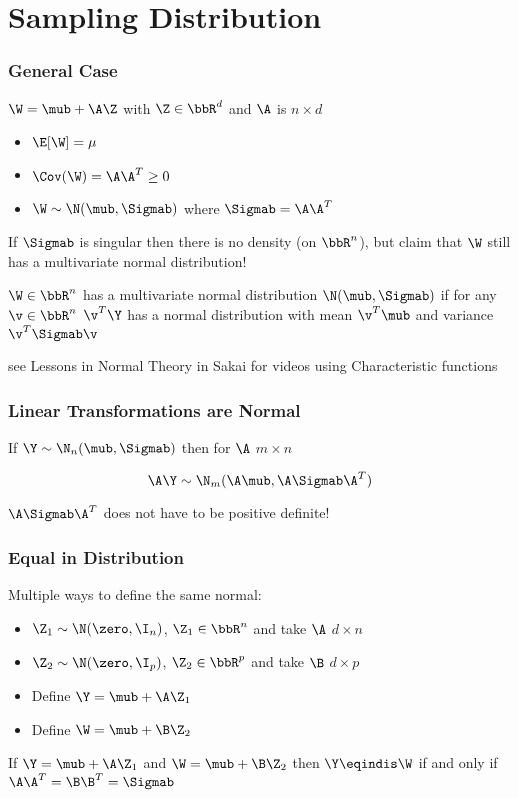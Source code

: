 \documentclass{beamer}
\begin{document}
\section{Sampling Distribution}

\begin{frame} \frametitle{General Case}
$\W = \mub + \A \Z$  with $\Z \in \bbR^d$ and $\A$ is $n \times d$ \pause
\begin{itemize}
\item $\E[\W] = \mu$ \pause
\item $\Cov(\W) = \A \A^T \ge 0$ \pause
\item $\W \sim \N(\mub, \Sigmab)$ where $\Sigmab = \A \A^T$
\end{itemize}
  If $\Sigmab$ is singular then there is no density (on $\bbR^n$), but claim that
  $\W$ still has a multivariate normal distribution!  \pause

 \begin{definition}
  $\W \in \bbR^n$ has a  multivariate normal distribution $\N(\mub,
  \Sigmab)$ if for any $\v \in \bbR^n$ $\v^T\Y$ has a normal
  distribution with mean $\v^T\mub$ and variance $\v^T\Sigmab \v$
  \end{definition} \pause

see Lessons in Normal Theory in Sakai for videos using Characteristic functions
\end{frame}

\begin{frame} \frametitle{Linear Transformations are Normal}

If $\Y \sim \N_n(\mub, \Sigmab)$ then for $\A$ $m \times n$

$$\A \Y \sim \N_m(\A \mub, \A \Sigmab \A^T)$$


$\A \Sigmab \A^T$ does not have to be positive definite!
  


\end{frame}
\begin{frame}
  \frametitle{Equal in Distribution}
  Multiple ways to define the same normal: \pause

  \begin{itemize}
  \item 
$\Z_1 \sim \N(\zero, \I_n)$, $\Z_1 \in \bbR^n$  and take $\A$ $d
\times n$ \pause
\item $\Z_2 \sim \N(\zero, \I_p)$,  $\Z_2 \in \bbR^p$  and take $\B$ $d
\times p$ \pause
\item Define $\Y = \mub + \A \Z_1$ \pause
\item Define $\W = \mub + \B \Z_2$ \pause
  \end{itemize}
  \begin{theorem}
    If  $\Y = \mub + \A \Z_1$ and $\W = \mub + \B \Z_2$ then $\Y
    \eqindis \W$ if and only if $\A \A^T = \B \B^T = \Sigmab$
  \end{theorem}
\end{frame}
\end{document}
